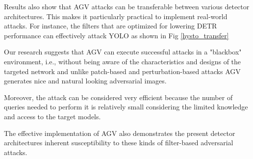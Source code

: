 \documentclass[a4paper,12 pt]{report}
\begin{document}

Results also show that AGV attacks can be transferable between various detector architectures.
This makes it particularly practical to implement real-world attacks. For instance, the filters that are optimized for lowering DETR performance can effectively attack YOLO as shown in Fig \ref{hysto_transfer} 



Our research suggests that AGV can execute successful attacks in a "blackbox" environment, i.e., without being aware of the characteristics and designs of the targeted network and unlike patch-based and perturbation-based attacks AGV generates nice and natural looking adversarial images.



\noindent Moreover, the attack can be considered very efficient because the number of queries needed to perform it is relatively small considering the limited knowledge and access to the target models.



The effective implementation of AGV also demonstrates the present detector architectures inherent susceptibility to these kinds of filter-based adversarial attacks.




 


\printbibliography[title={Bibliography}]
\end{document}
